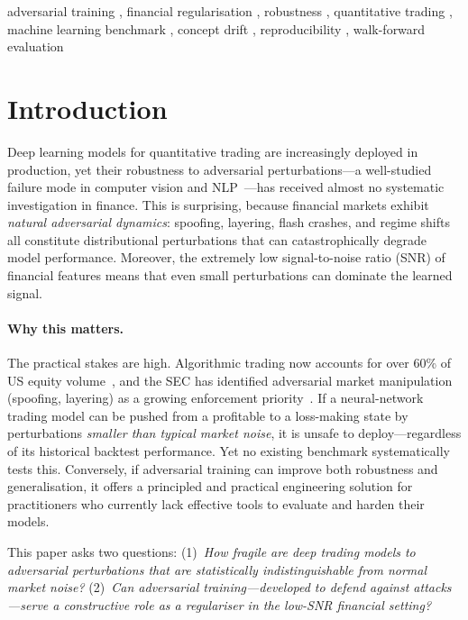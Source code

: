 \documentclass[preprint,review,12pt]{elsarticle}
\begin{document}
\begin{frontmatter}
\begin{keyword}
adversarial training \sep
financial regularisation \sep
robustness \sep
quantitative trading \sep
machine learning benchmark \sep
concept drift \sep
reproducibility \sep
walk-forward evaluation
\end{keyword}

\end{frontmatter}


\section{Introduction}
\label{sec:intro}

Deep learning models for quantitative trading are increasingly deployed in production, yet their robustness to adversarial perturbations---a well-studied failure mode in computer vision and NLP~\citep{ref_goodfellow_fgsm,ref_madry_pgd}---has received almost no systematic investigation in finance.
This is surprising, because financial markets exhibit \emph{natural adversarial dynamics}: spoofing, layering, flash crashes, and regime shifts all constitute distributional perturbations that can catastrophically degrade model performance.
Moreover, the extremely low signal-to-noise ratio (SNR) of financial features means that even small perturbations can dominate the learned signal.

\paragraph{Why this matters.}
The practical stakes are high.
Algorithmic trading now accounts for over 60\% of US equity volume~\citep{ref_sec2020}, and the SEC has identified adversarial market manipulation (spoofing, layering) as a growing enforcement priority~\citep{ref_cartea2015}.
If a neural-network trading model can be pushed from a profitable to a loss-making state by perturbations \emph{smaller than typical market noise}, it is unsafe to deploy---regardless of its historical backtest performance.
Yet no existing benchmark systematically tests this.
Conversely, if adversarial training can improve both robustness and generalisation, it offers a principled and practical engineering solution for practitioners who currently lack effective tools to evaluate and harden their models.

This paper asks two questions:
(1)~\emph{How fragile are deep trading models to adversarial perturbations that are statistically indistinguishable from normal market noise?}
(2)~\emph{Can adversarial training---developed to defend against attacks---serve a constructive role as a regulariser in the low-SNR financial setting?}
\end{document}
